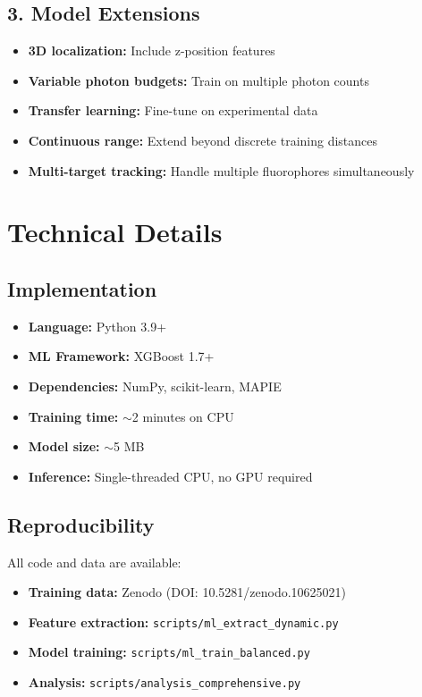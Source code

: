 \documentclass[a4paper,11pt]{article}
\begin{document}
\subsection{3. Model Extensions}

\begin{itemize}[leftmargin=*]
    \item \textbf{3D localization:} Include z-position features
    \item \textbf{Variable photon budgets:} Train on multiple photon counts
    \item \textbf{Transfer learning:} Fine-tune on experimental data
    \item \textbf{Continuous range:} Extend beyond discrete training distances
    \item \textbf{Multi-target tracking:} Handle multiple fluorophores simultaneously
\end{itemize}

\section{Technical Details}

\subsection{Implementation}

\begin{itemize}[leftmargin=*]
    \item \textbf{Language:} Python 3.9+
    \item \textbf{ML Framework:} XGBoost 1.7+
    \item \textbf{Dependencies:} NumPy, scikit-learn, MAPIE
    \item \textbf{Training time:} $\sim$2 minutes on CPU
    \item \textbf{Model size:} $\sim$5 MB
    \item \textbf{Inference:} Single-threaded CPU, no GPU required
\end{itemize}

\subsection{Reproducibility}

All code and data are available:

\begin{itemize}[leftmargin=*]
    \item \textbf{Training data:} Zenodo (DOI: 10.5281/zenodo.10625021)
    \item \textbf{Feature extraction:} \texttt{scripts/ml\_extract\_dynamic.py}
    \item \textbf{Model training:} \texttt{scripts/ml\_train\_balanced.py}
    \item \textbf{Analysis:} \texttt{scripts/analysis\_comprehensive.py}
\end{itemize}
\end{document}
